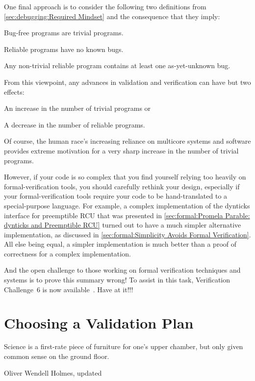 One final approach is to consider the following two definitions from
\cref{sec:debugging:Required Mindset}
and the consequence that they imply:

\begin{description}[itemsep=0pt,labelindent=1em]
\item[Definition:]	Bug-free programs are trivial programs.
\item[Definition:]	Reliable programs have no known bugs.
\item[Consequence:]	Any non-trivial reliable program contains at least
			one as-yet-unknown bug.
\end{description}

From this viewpoint, any advances in validation and verification can
have but two effects:
\begin{enumerate*}[(1)]
\item An increase in the number of trivial programs or
\item A decrease in the number of reliable programs.
\end{enumerate*}
Of course, the human race's increasing reliance on multicore systems and
software provides extreme motivation for a very sharp increase in the
number of trivial programs.

However, if your code is so complex that you find yourself
relying too heavily on formal-verification
tools, you should carefully rethink your design, especially if your
formal-verification tools require your code to be hand-translated
to a special-purpose language.
For example, a complex implementation of the dynticks interface for
preemptible RCU that was presented in
\cref{sec:formal:Promela Parable: dynticks and Preemptible RCU}
turned out to
have a much simpler alternative implementation, as discussed in
\cref{sec:formal:Simplicity Avoids Formal Verification}.
All else being equal, a simpler implementation is much better than
a proof of correctness for a complex implementation.

And the open challenge to those working on formal verification techniques
and systems is to prove this summary wrong!
To assist in this task, Verification Challenge~6 is now
available~\cite{PaulEMcKenney2017VerificationChallenge6}.
Have at it!!!

\section{Choosing a Validation Plan}
\label{sec:formal:Choosing a Validation Plan}
%
\epigraph{Science is a first-rate piece of furniture for one's upper
	  chamber, but only given common sense on the ground floor.}
	 {Oliver Wendell Holmes, updated}

